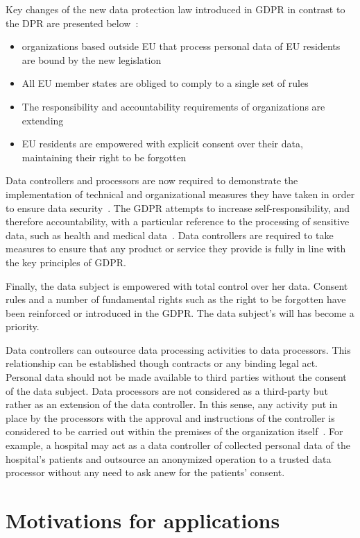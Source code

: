 Key changes of the new data protection law introduced in GDPR in contrast to the DPR are presented below~\cite{DBLP:journals/corr/NeisseSF17}:
\begin{itemize}
    \item organizations based outside EU that process personal data of EU residents are bound by the new legislation
    \item All EU member states are obliged to comply to a single set of rules
    \item The responsibility and accountability requirements of organizations are extending
    \item EU residents are empowered with explicit consent over their data, maintaining their right to be forgotten
\end{itemize}

Data controllers and processors are now required to demonstrate the implementation of technical and organizational measures they have taken in order to ensure data security~\cite{mhmd}. The GDPR attempts to increase self-responsibility, and therefore accountability, with a particular reference to the processing of sensitive data, such as health and medical data~\cite{mhmd}. Data controllers are required to take measures to ensure that any product or service they provide is fully in line with the key principles of GDPR.

Finally, the data subject is empowered with total control over her data. Consent rules and a number of fundamental rights such as the right to be forgotten have been reinforced or introduced in the GDPR. The data subject's will has become a priority.

Data controllers can outsource data processing activities to data processors. This relationship can be established though contracts or any binding legal act. Personal data should not be made available to third parties without the consent of the data subject. Data processors are not considered as a third-party but rather as an extension of the data controller. In this sense, any activity put in place by the processors with the approval and instructions of the controller is considered to be carried out within the premises of the organization itself~\cite{mhmd}. For example, a hospital may act as a data controller of collected personal data of the hospital's patients and outsource an anonymized operation to a trusted data processor without any need to ask anew for the patients' consent.

\section{Motivations for applications}\label{problem:motivations}


